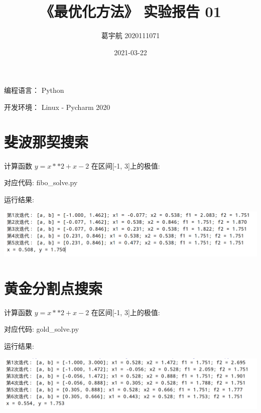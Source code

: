 \documentclass[a4paper,11pt]{article} [NO-DEFAULT-PACKAGES] \usepackage{wx672hyperref}
\author{葛宇航 2020111071}
\date{2021-03-22}
\title{《最优化方法》 实验报告 01}
\begin{document}

\maketitle
编程语言： Python

开发环境： Linux - Pycharm 2020


\section*{斐波那契搜索}
\label{sec:org9b4ea6a}
计算函数 \(y = x**2 + x - 2\) 在区间[-1, 3]上的极值:

对应代码: fibo\_solve.py

运行结果:
\begin{center}
\includegraphics[width=0.8\linewidth]{2021-03-22_15-57-11_screenshot.png}
\end{center}

\section*{黄金分割点搜索}
\label{sec:orgaf2f859}
计算函数 \(y = x**2 + x - 2\) 在区间[-1, 3]上的极值:

对应代码: gold\_solve.py

运行结果:
\begin{center}
\includegraphics[width=0.8\linewidth]{2021-03-22_15-56-41_screenshot.png}
\end{center}
\end{document}
